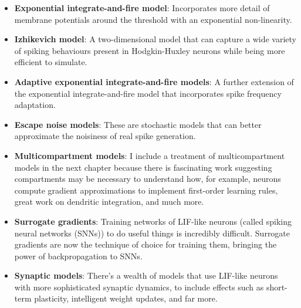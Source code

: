 \documentclass{article}
\begin{document}
\begin{itemize}
    \item \textbf{Exponential integrate-and-fire model}: Incorporates more detail of membrane potentials around the threshold with an exponential non-linearity.
    \item \textbf{Izhikevich model}: A two-dimensional model that can capture a wide variety of spiking behaviours present in Hodgkin-Huxley neurons while being more efficient to simulate.
    \item \textbf{Adaptive exponential integrate-and-fire models}: A further extension of the exponential integrate-and-fire model that incorporates spike frequency adaptation.
    \item \textbf{Escape noise models}: These are stochastic models that can better approximate the noisiness of real spike generation.
    \item \textbf{Multicompartment models}: I include a treatment of multicompartment models in the next chapter because there is fascinating work suggesting compartments may be necessary to understand how, for example, neurons compute gradient approximations to implement first-order learning rules, great work on dendritic integration, and much more.
    \item \textbf{Surrogate gradients}: Training networks of LIF-like neurons (called spiking neural networks (SNNs)) to do useful things is incredibly difficult. Surrogate gradients are now the technique of choice for training them, bringing the power of backpropagation to SNNs.
    \item \textbf{Synaptic models}: There's a wealth of models that use LIF-like neurons with more sophisticated synaptic dynamics, to include effects such as short-term plasticity, intelligent weight updates, and far more.
\end{itemize}
    
\end{document}
